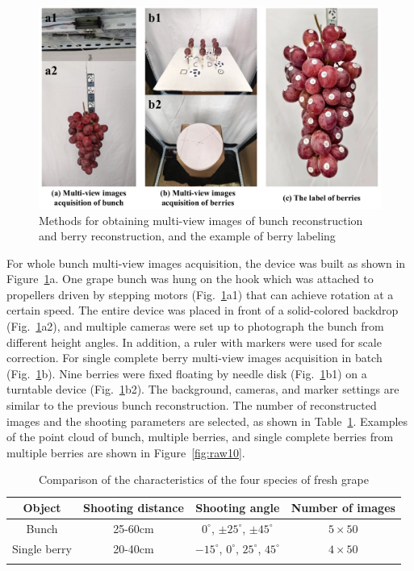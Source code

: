 \documentclass[12pt]{article}
\begin{document}
\begin{figure}[hbt!]
    \centering
    \includegraphics[width=1\textwidth]{figures/Figure3.pdf}
    \caption{Methods for obtaining multi-view images of bunch reconstruction and berry reconstruction, and the example of berry labeling}
    \label{fig:raw9}
\end{figure}

For whole bunch multi-view images acquisition, the device was built as shown in Figure~\ref{fig:raw9}a. 
One grape bunch was hung on the hook which was attached to propellers driven by stepping motors (Fig.~\ref{fig:raw9}a1) that can achieve rotation at a certain speed. 
The entire device was placed in front of a solid-colored backdrop (Fig.~\ref{fig:raw9}a2), and multiple cameras were set up to photograph the bunch from different height angles. 
In addition, a ruler with markers were used for scale correction. 
For single complete berry multi-view images acquisition in batch (Fig.~\ref{fig:raw9}b). 
Nine berries were fixed floating by needle disk (Fig.~\ref{fig:raw9}b1) on a turntable device (Fig.~\ref{fig:raw9}b2). 
The background, cameras, and marker settings are similar to the previous bunch reconstruction. 
The number of reconstructed images and the shooting parameters are selected, as shown in Table~\ref{tbl:2}. 
Examples of the point cloud of bunch, multiple berries, and single complete berries from multiple berries are shown in Figure~\ref{fig:raw10}.

\begin{table}[h]
    \centering
    \caption{Comparison of the characteristics of the four species of fresh grape}
    \begin{tabular}{cccc}
        \hline
        \textbf{Object} & \textbf{Shooting distance} & \textbf{Shooting angle} & \textbf{Number of images} \\
        \hline
        Bunch        & 25-60cm & $0^{\circ}$, $\pm 25^{\circ}$, $\pm 45^{\circ}$ & $5 \times 50$ \\
        Single berry & 20-40cm & $-15^{\circ}$, $0^{\circ}$, $25^{\circ}$, $45^{\circ}$ & $4 \times 50$ \\
        \hline
    \label{tbl:2}
    \end{tabular}
\end{table}
\end{document}

